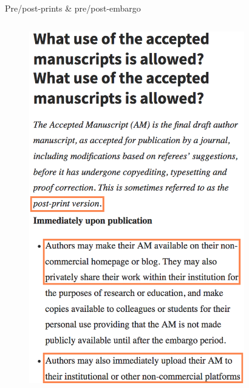 \documentclass[10pt]{beamer}
\begin{document}
\begin{frame}{Pre/post-prints \& pre/post-embargo}
\begin{columns}
	\begin{column}{0.52\linewidth}
		\begin{figure}
    		\centering
  			\includegraphics[trim={0pt 0pt 0pt 110pt}, clip, width=\columnwidth]{images/licenceFAQ004a}
        \end{figure}
    \end{column}
    \begin{column}{0.45\linewidth}
        \begin{figure}
    	    \centering

\end{figure}
\end{column}
\end{columns}
\end{frame}
\end{document}
